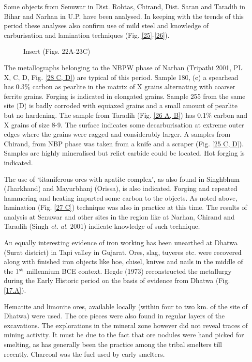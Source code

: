 Some objects from Senuwar in Dist. Rohtas, Chirand, Dist. Saran and Taradih in Bihar and Narhan in U.P. have been analysed. In keeping with the trends of this period these analyses also confirm use of mild steel and knowledge of carburisation and lamination techniques (Fig. \ref{25}-\ref{26}). 

\begin{figure}[H]
Insert (Figs. 22A-23C)
\end{figure}

\vspace{-.3cm}

The metallographs belonging to the NBPW phase of Narhan (Tripathi 2001, PL X, C, D, Fig. \ref{28 C, D}) are typical of this period. Sample 180, (c) a spearhead has 0.3\% carbon as pearlite in the matrix of X grains alternating with coarser ferrite grains. Forging is indicated in elongated grains. Sample 255 from the same site (D) is badly corroded with equiaxed grains and a small amount of pearlite but no hardening. The sample from Taradih (Fig. \ref{26 A, B}) has 0.1\% carbon and X grains of size 8-9. The surface indicates some decarburisation at extreme outer edges where the grains were ragged and considerably larger. A samples from Chirand, from NBP phase was taken from a knife and a scraper (Fig. \ref{25 C, D}). Samples are highly mineralised but relict carbide could be located. Hot forging is indicated.

The use of ‘titaniferous ores with apatite complex’, as also found in Singhbhum (Jharkhand) and Mayurbhanj (Orissa), is also indicated. Forging and repeated hammering and heating imparted some carbon to the objects. As noted above, lamination (Fig. \ref{27 C}) technique was also in practice at this time. The results of analysis at Senuwar and other sites in the region like at Narhan, Chirand and Taradih (Singh {\it et. al.} 2001) indicate knowledge of such technique. 

An equally interesting evidence of iron working has been unearthed at Dhatwa (Surat district) in Tapi valley in Gujarat. Ores, slag, tuyeres etc. were recovered along with finished iron objects like hoe, chisel, knives and nails in the middle of the $1^{\rm st}$ millennium BCE context. Hegde (1973) reconstructed the metallurgy during the Early Historic period on the basis of evidence from Dhatwa (Fig. \ref{17.A}). 

Hematite and limonite ores, available locally (within four to two km. of the site of Dhatwa) were used. The ore pieces were also found in regular layers of the excavations. The explorations in the mineral zone however did not reveal traces of mining activity. It must be due to the fact that ore nodules were hand picked for smelting, as has generally been the practice among the tribal smelters till recently. Charcoal was the fuel used by early smelters. 

